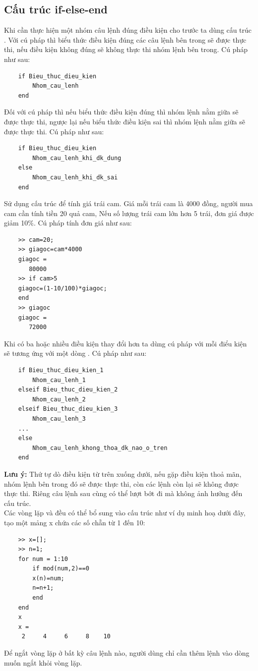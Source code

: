 \documentclass[12pt,a4paper]{article}
\begin{document}
\subsection{Cấu trúc if-else-end}
Khi cần thực hiện một nhóm câu lệnh đúng điều kiện cho trước ta dùng cấu trúc . Với cú pháp  thì biểu thức điều kiện đúng các câu lệnh bên trong sẽ được thực thi, nếu điều kiện không đúng sẽ không thực thi nhóm lệnh bên trong. Cú pháp như sau:
\begin{lstlisting}
	if Bieu_thuc_dieu_kien
		Nhom_cau_lenh
	end
\end{lstlisting}
Đối với cú pháp  thì nếu biểu thức điều kiện đúng thì nhóm lệnh nằm giữa  sẽ được thực thi, ngược lại nếu biểu thức điều kiện sai thì nhóm lệnh nằm giữa  sẽ được thực thi. Cú pháp như sau:
\begin{lstlisting}
	if Bieu_thuc_dieu_kien
		Nhom_cau_lenh_khi_dk_dung
	else
		Nhom_cau_lenh_khi_dk_sai
	end
\end{lstlisting}
\begin{example}
Sử dụng cấu trúc  để tính giá trái cam. Giá mỗi trái cam là 4000 đồng, người mua cam cần tính tiền 20 quả cam, Nếu số lượng trái cam lớn hơn 5 trái, đơn giá được giảm 10\%. Cú pháp tính đơn giá như sau:
\begin{lstlisting}
	>> cam=20;
	>> giagoc=cam*4000
	giagoc =
       80000
	>> if cam>5
	giagoc=(1-10/100)*giagoc;
	end
	>> giagoc
	giagoc =
       72000
\end{lstlisting}
\end{example}
Khi có ba hoặc nhiều điều kiện thay đổi hơn ta dùng cú pháp  với mỗi điểu kiện sẽ tương ứng với một dòng . Cú pháp như sau:
\begin{lstlisting}
	if Bieu_thuc_dieu_kien_1
		Nhom_cau_lenh_1
	elseif Bieu_thuc_dieu_kien_2
		Nhom_cau_lenh_2
	elseif Bieu_thuc_dieu_kien_3
		Nhom_cau_lenh_3
	...
	else
		Nhom_cau_lenh_khong_thoa_dk_nao_o_tren
	end
\end{lstlisting}
\textbf{Lưu ý:} Thứ tự dò điều kiện từ trên xuống dưới, nếu gặp điều kiện thoả mãn, nhóm lệnh bên trong đó sẽ được thực thi, còn các lệnh còn lại sẽ không được thực thi. Riêng câu lệnh  sau cùng có thể lượt bớt đi mà không ảnh hưởng đến cấu trúc.\\
Các vòng lặp  và  đều có thể bổ sung vào cấu trúc  như ví dụ minh hoạ dưới đây, tạo một mảng x chứa các số chẵn từ 1 đến 10:
\begin{lstlisting}
	>> x=[];
	>> n=1;
	for num = 1:10
		if mod(num,2)==0
		x(n)=num;
		n=n+1;
		end
	end
	x
	x =
     2     4     6     8    10
\end{lstlisting}
Để ngắt vòng lặp ở bất kỳ câu lệnh nào, người dùng chỉ cần thêm lệnh \textbf{} vào dòng muốn ngắt khỏi vòng lặp.
\end{document}

